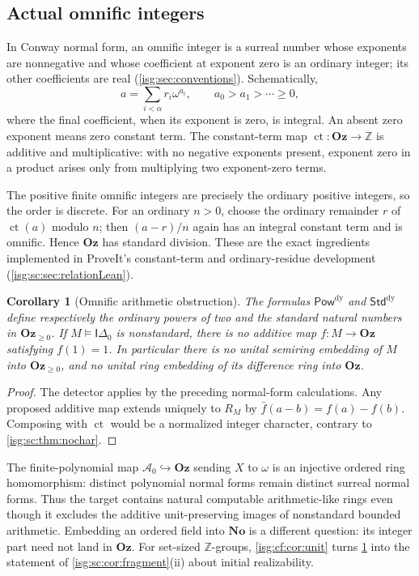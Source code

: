 \documentclass[11pt]{article}
\newtheorem{corollary}[corollary]{Corollary}
\theoremstyle{definition}
\theoremstyle{remark}
\newcommand{\No}{\ensuremath{\mathbf{No}}}
\newcommand{\Oz}{\ensuremath{\mathbf{Oz}}}
\newcommand{\Z}{\mathbb{Z}}
\newcommand{\ct}{\operatorname{ct}}
\newcommand{\PowDy}{\mathsf{Pow}^{\mathrm{dy}}}
\newcommand{\StdDy}{\mathsf{Std}^{\mathrm{dy}}}
\newcommand{\Idelta}{\mathsf{I}\Delta_0}
\newcommand{\Asc}{\mathcal{A}}
\begin{document}
\subsection{Actual omnific integers}
In Conway normal form, an omnific integer is a surreal number whose
exponents are nonnegative and whose coefficient at exponent zero is an
ordinary integer; its other coefficients are real
(\cref{isg:sec:conventions}). Schematically,
\[
 a=\sum_{i<\alpha}r_i\omega^{a_i},\qquad a_0>a_1>\cdots\ge0,
\]
where the final coefficient, when its exponent is zero, is integral. An
absent zero exponent means zero constant term. The constant-term map
$\ct:\Oz\to\Z$ is additive and multiplicative: with no negative exponents
present, exponent zero in a product arises only from multiplying two
exponent-zero terms.

The positive finite omnific integers are precisely the ordinary positive
integers, so the order is discrete. For an ordinary $n>0$, choose the
ordinary remainder $r$ of $\ct(a)$ modulo $n$; then $(a-r)/n$ again has an
integral constant term and is omnific. Hence $\Oz$ has standard division.
These are the exact ingredients implemented in ProveIt's constant-term and
ordinary-residue development \cite{Residues}
(\cref{isg:sc:sec:relationLean}).

\begin{corollary}[Omnific arithmetic obstruction]\label{isg:sc:cor:omnific}
The formulas $\PowDy$ and $\StdDy$ define respectively the ordinary powers
of two and the standard natural numbers in $\Oz_{\ge0}$. If
$M\models\Idelta$ is nonstandard, there is no additive map $f:M\to\Oz$
satisfying $f(1)=1$. In particular there is no unital semiring embedding
of $M$ into $\Oz_{\ge0}$, and no unital ring embedding of its difference
ring into $\Oz$.
\end{corollary}
\begin{proof}
The detector applies by the preceding normal-form calculations. Any
proposed additive map extends uniquely to $R_M$ by
$\bar f(a-b)=f(a)-f(b)$. Composing with $\ct$ would be a normalized
integer character, contrary to \cref{isg:sc:thm:nochar}.
\end{proof}

The finite-polynomial map $\Asc_0\hookrightarrow\Oz$ sending $X$ to
$\omega$ is an injective ordered ring homomorphism: distinct polynomial
normal forms remain distinct surreal normal forms. Thus the target contains
natural computable arithmetic-like rings even though it excludes the
additive unit-preserving images of nonstandard bounded arithmetic.
Embedding an ordered field into $\No$ is a different question: its integer
part need not land in $\Oz$. For set-sized $\Z$-groups,
\cref{isg:cf:cor:unit} turns \cref{isg:sc:cor:omnific} into the statement
of \cref{isg:sc:cor:fragment}(ii) about initial realizability.
\end{document}
